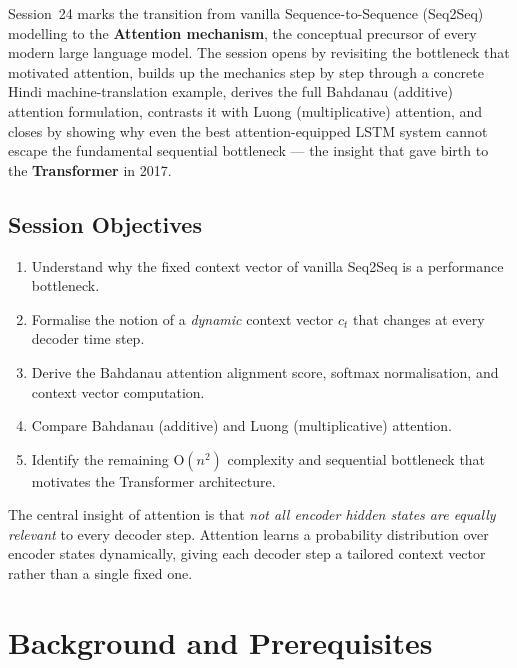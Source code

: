 \documentclass[12pt,a4paper]{article}
\newcommand{\ct}{c_t}
\begin{document}
Session~24 marks the transition from vanilla Sequence-to-Sequence
(Seq2Seq) modelling to the \textbf{Attention mechanism}, the
conceptual precursor of every modern large language model.  The
session opens by revisiting the bottleneck that motivated attention,
builds up the mechanics step by step through a concrete Hindi
machine-translation example, derives the full Bahdanau (additive)
attention formulation, contrasts it with Luong (multiplicative)
attention, and closes by showing why even the best attention-equipped
LSTM system cannot escape the fundamental sequential bottleneck ---
the insight that gave birth to the \textbf{Transformer} in 2017.

\subsection*{Session Objectives}
\begin{enumerate}[label=\arabic*.]
  \item Understand why the fixed context vector of vanilla Seq2Seq
        is a performance bottleneck.
  \item Formalise the notion of a \emph{dynamic} context vector
        $\ct$ that changes at every decoder time step.
  \item Derive the Bahdanau attention alignment score, softmax
        normalisation, and context vector computation.
  \item Compare Bahdanau (additive) and Luong (multiplicative)
        attention.
  \item Identify the remaining O$(n^{2})$ complexity and sequential
        bottleneck that motivates the Transformer architecture.
\end{enumerate}

\begin{keyinsight}[title=Session Theme]
  The central insight of attention is that \emph{not all encoder
  hidden states are equally relevant} to every decoder step.
  Attention learns a probability distribution over encoder states
  dynamically, giving each decoder step a tailored context vector
  rather than a single fixed one.
\end{keyinsight}

\section{Background and Prerequisites}
\label{sec:background}
\end{document}
